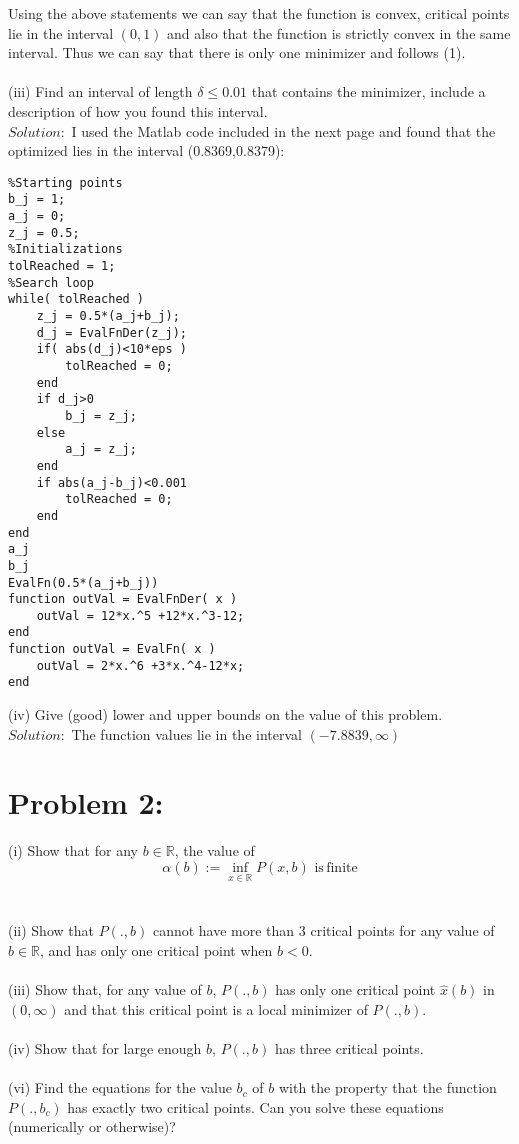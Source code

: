 \documentclass[12pt]{report}
\begin{document}
Using the above statements we can say that the function is convex, critical points lie in the interval $(0,1)$ and also that the
function is strictly convex in the same interval. Thus we can say that there is only one minimizer and follows (1).
\\
\\
(iii) Find an interval of length $\delta \leq 0.01$ that contains the minimizer, include a description of how you found this
interval.\\
$Solution:$ I used the Matlab code included in the next page and found that the optimized lies in the interval (0.8369,0.8379):
\begin{lstlisting}
%Starting points
b_j = 1;
a_j = 0;
z_j = 0.5;
%Initializations
tolReached = 1;
%Search loop
while( tolReached )
    z_j = 0.5*(a_j+b_j);
    d_j = EvalFnDer(z_j);
    if( abs(d_j)<10*eps )
        tolReached = 0;
    end
    if d_j>0
        b_j = z_j;
    else
        a_j = z_j;
    end
    if abs(a_j-b_j)<0.001
        tolReached = 0;
    end
end
a_j
b_j
EvalFn(0.5*(a_j+b_j))
function outVal = EvalFnDer( x )
    outVal = 12*x.^5 +12*x.^3-12;
end
function outVal = EvalFn( x )
    outVal = 2*x.^6 +3*x.^4-12*x;
end
\end{lstlisting}

(iv) Give (good) lower and upper bounds on the value of this problem.\\
$Solution:$ The function values lie in the interval $(-7.8839,\infty)$

\pagebreak

\section*{Problem 2:}
(i) Show that for any $b\in\mathbb{R}$, the value of $$\alpha(b):=\inf_{x\in\mathbb{R}}P(x,b) \,\,  \mathrm{is\,finite}$$\\
\\
(ii) Show that $P(.,b)$ cannot have more than 3 critical points for any value of $b\in\mathbb{R}$, and has only one critical
point when $b<0$.\\
\\
(iii) Show that, for any value of $b$, $P(.,b)$ has only one critical point $\hat{x}(b)$ in $(0,\infty)$ and that this critical
point is a local minimizer of $P (., b)$.\\
\\
(iv) Show that for large enough $b$, $P (., b)$ has three critical points.\\
\\
(vi) Find the equations for the value $b_c$ of $b$ with the property that the function $P (., b_c )$ has exactly two critical points. Can you solve these equations (numerically or otherwise)?
\end{document}
